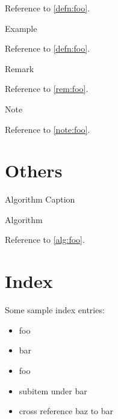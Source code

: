 Reference to \cref{defn:foo}.

\begin{exmp}\label{exmp:foo}
  Example
\end{exmp}

Reference to \cref{defn:foo}.

\begin{rem}\label{rem:foo}
  Remark
\end{rem}

Reference to \cref{rem:foo}.

\begin{note}\label{note:foo}
  Note
\end{note}

Reference to \cref{note:foo}.

\section {Others}
\begin{algorithm}
  \caption{Algorithm Caption\label{alg:foo}}
  Algorithm
\end{algorithm}

Reference to \cref{alg:foo}.

\section{Index}
Some sample index entries:
\begin{itemize}
\item foo
\item bar
  \clearpage
\item foo
\item subitem under bar
\item cross reference baz to bar
\end{itemize}

